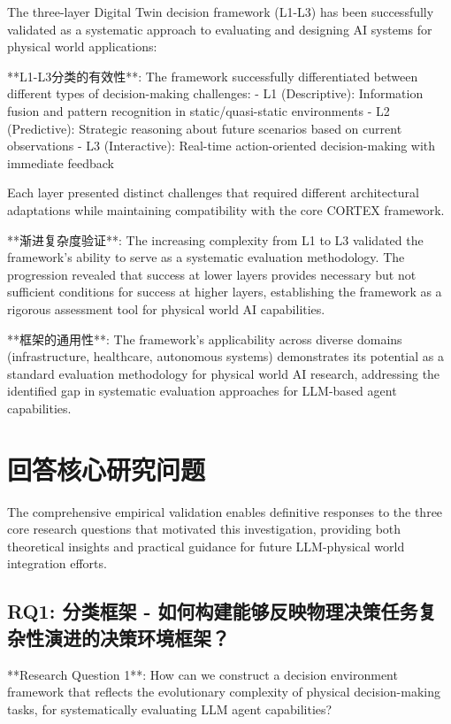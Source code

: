 The three-layer Digital Twin decision framework (L1-L3) has been successfully validated as a systematic approach to evaluating and designing AI systems for physical world applications:

**L1-L3分类的有效性**: The framework successfully differentiated between different types of decision-making challenges:
- L1 (Descriptive): Information fusion and pattern recognition in static/quasi-static environments
- L2 (Predictive): Strategic reasoning about future scenarios based on current observations
- L3 (Interactive): Real-time action-oriented decision-making with immediate feedback

Each layer presented distinct challenges that required different architectural adaptations while maintaining compatibility with the core CORTEX framework.

**渐进复杂度验证**: The increasing complexity from L1 to L3 validated the framework's ability to serve as a systematic evaluation methodology. The progression revealed that success at lower layers provides necessary but not sufficient conditions for success at higher layers, establishing the framework as a rigorous assessment tool for physical world AI capabilities.

**框架的通用性**: The framework's applicability across diverse domains (infrastructure, healthcare, autonomous systems) demonstrates its potential as a standard evaluation methodology for physical world AI research, addressing the identified gap in systematic evaluation approaches for LLM-based agent capabilities.

\section{回答核心研究问题}

The comprehensive empirical validation enables definitive responses to the three core research questions that motivated this investigation, providing both theoretical insights and practical guidance for future LLM-physical world integration efforts.

\subsection{RQ1: 分类框架 - 如何构建能够反映物理决策任务复杂性演进的决策环境框架？}

**Research Question 1**: How can we construct a decision environment framework that reflects the evolutionary complexity of physical decision-making tasks, for systematically evaluating LLM agent capabilities?

